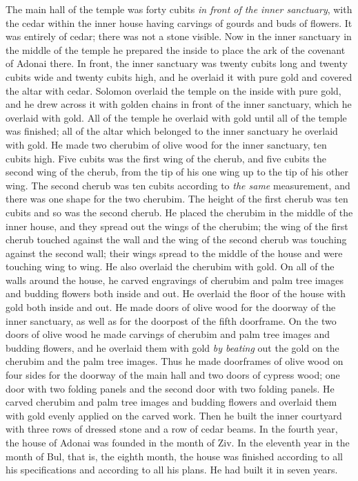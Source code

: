 \begin{biblechapter}
\verse The main hall of the temple was forty cubits \textit{in front of the inner sanctuary},
\verse with the cedar within the inner house having carvings of gourds and buds of flowers. It was entirely of cedar; there was not a stone visible.
\verse Now in the inner sanctuary in the middle of the temple he prepared the inside to place the ark of the covenant of Adonai there.
\verse In front, the inner sanctuary was twenty cubits long and twenty cubits wide and twenty cubits high, and he overlaid it with pure gold and covered the altar with cedar.
\verse Solomon overlaid the temple on the inside with pure gold, and he drew across it with golden chains in front of the inner sanctuary, which he overlaid with gold.
\verse All of the temple he overlaid with gold until all of the temple was finished; all of the altar which belonged to the inner sanctuary he overlaid with gold.
\verse He made two cherubim of olive wood for the inner sanctuary, ten cubits high.
\verse Five cubits was the first wing of the cherub, and five cubits the second wing of the cherub, from the tip of his one wing up to the tip of his other wing.
\verse The second cherub was ten cubits according to \textit{the same} measurement, and there was one shape for the two cherubim.
\verse The height of the first cherub was ten cubits and so was the second cherub.
\verse He placed the cherubim in the middle of the inner house, and they spread out the wings of the cherubim; the wing of the first cherub touched against the wall and the wing of the second cherub was touching against the second wall; their wings spread to the middle of the house and were touching wing to wing.
\verse He also overlaid the cherubim with gold.
\verse On all of the walls around the house, he carved engravings of cherubim and palm tree images and budding flowers both inside and out.
\verse He overlaid the floor of the house with gold both inside and out.
\verse He made doors of olive wood for the doorway of the inner sanctuary, as well as for the doorpost of the fifth doorframe.
\verse On the two doors of olive wood he made carvings of cherubim and palm tree images and budding flowers, and he overlaid them with gold \textit{by beating} out the gold on the cherubim and the palm tree images.
\verse Thus he made doorframes of olive wood on four sides for the doorway of the main hall
\verse and two doors of cypress wood; one door with two folding panels and the second door with two folding panels.
\verse He carved cherubim and palm tree images and budding flowers and overlaid them with gold evenly applied on the carved work.
\verse Then he built the inner courtyard with three rows of dressed stone and a row of cedar beams.
\verse In the fourth year, the house of Adonai was founded in the month of Ziv.
\verse In the eleventh year in the month of Bul, that is, the eighth month, the house was finished according to all his specifications and according to all his plans. He had built it in seven years.
\end{biblechapter}

